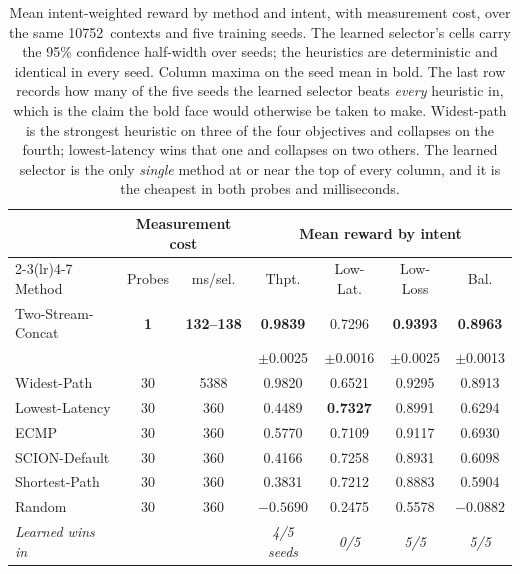 \begin{table}[t]
  \centering
  \caption[Reward by method and intent, with measurement cost]{Mean intent-weighted reward by method and intent, with measurement cost, over the same
  10752~contexts and five training seeds. The learned selector's cells carry the 95\% confidence
  half-width over seeds; the heuristics are deterministic and identical in every seed. Column maxima on
  the seed mean in bold. The last row records how many of the five seeds the learned selector beats
  \emph{every} heuristic in, which is the claim the bold face would otherwise be taken to make.
  Widest-path is the strongest heuristic on three of the four objectives and collapses on the fourth;
  lowest-latency wins that one and collapses on two others. The learned selector is the only \emph{single}
  method at or near the top of every column, and it is the cheapest in both probes and milliseconds.}
  \label{tab:p1eval:probing}
  \small
  \begin{tabular}{lcccccc}
    \toprule
    & \multicolumn{2}{c}{Measurement cost} & \multicolumn{4}{c}{Mean reward by intent} \\
    \cmidrule(lr){2-3}\cmidrule(lr){4-7}
    Method & Probes & ms/sel. & Thpt. & Low-Lat. & Low-Loss & Bal. \\
    \midrule
    Two-Stream-Concat & \textbf{1}  & \textbf{132--138}
                      & \textbf{0.9839} & 0.7296 & \textbf{0.9393} & \textbf{0.8963} \\
                      &    &      & {\scriptsize $\pm$0.0025} & {\scriptsize $\pm$0.0016}
                      & {\scriptsize $\pm$0.0025} & {\scriptsize $\pm$0.0013} \\
    \midrule
    Widest-Path       & 30 & 5388 & 0.9820 & 0.6521 & 0.9295 & 0.8913 \\
    Lowest-Latency    & 30 & 360  & 0.4489 & \textbf{0.7327} & 0.8991 & 0.6294 \\
    ECMP              & 30 & 360  & 0.5770 & 0.7109 & 0.9117 & 0.6930 \\
    SCION-Default     & 30 & 360  & 0.4166 & 0.7258 & 0.8931 & 0.6098 \\
    Shortest-Path     & 30 & 360  & 0.3831 & 0.7212 & 0.8883 & 0.5904 \\
    Random            & 30 & 360  & $-0.5690$ & 0.2475 & 0.5578 & $-0.0882$ \\
    \midrule
    \emph{Learned wins in} & & & \emph{4/5 seeds} & \emph{0/5} & \emph{5/5} & \emph{5/5} \\
    \bottomrule
  \end{tabular}
\end{table}

